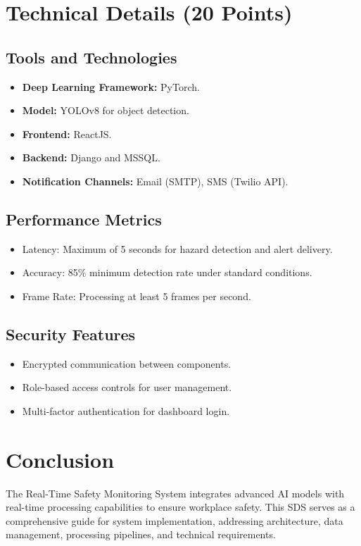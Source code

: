 \documentclass[12pt]{article}
\begin{document}
\section{Technical Details (20 Points)}
\subsection{Tools and Technologies}
\begin{itemize}
    \item \textbf{Deep Learning Framework:} PyTorch.
    \item \textbf{Model:} YOLOv8 for object detection.
    \item \textbf{Frontend:} ReactJS.
    \item \textbf{Backend:} Django and MSSQL.
    \item \textbf{Notification Channels:} Email (SMTP), SMS (Twilio API).
\end{itemize}

\subsection{Performance Metrics}
\begin{itemize}
    \item Latency: Maximum of 5 seconds for hazard detection and alert delivery.
    \item Accuracy: 85\% minimum detection rate under standard conditions.
    \item Frame Rate: Processing at least 5 frames per second.
\end{itemize}

\subsection{Security Features}
\begin{itemize}
    \item Encrypted communication between components.
    \item Role-based access controls for user management.
    \item Multi-factor authentication for dashboard login.
\end{itemize}

\newpage
\section{Conclusion}
The Real-Time Safety Monitoring System integrates advanced AI models with real-time processing capabilities to ensure workplace safety. This SDS serves as a comprehensive guide for system implementation, addressing architecture, data management, processing pipelines, and technical requirements.
\end{document}
